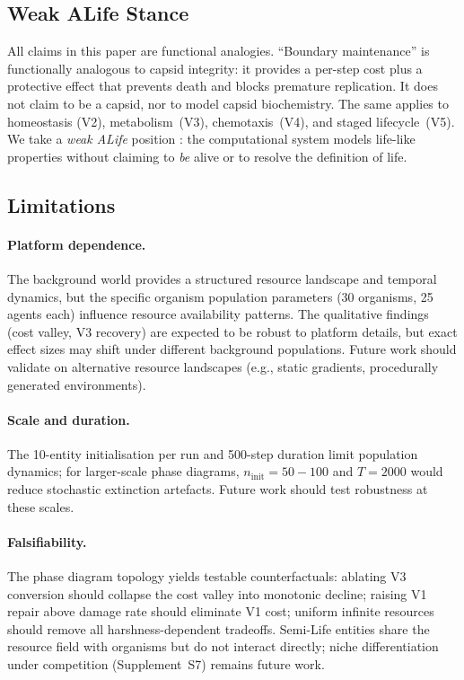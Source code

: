 \documentclass[letterpaper]{article}
\begin{document}
\subsection{Weak ALife Stance}

All claims in this paper are functional analogies.
``Boundary maintenance'' is functionally analogous to capsid integrity: it
provides a per-step cost plus a protective effect that prevents death and
blocks premature replication.
It does not claim to be a capsid, nor to model capsid biochemistry.
The same applies to homeostasis (V2), metabolism~(V3), chemotaxis~(V4),
and staged lifecycle~(V5).
We take a \emph{weak ALife} position \citep{langton_1989_artificial}:
the computational system models life-like properties without claiming to
\emph{be} alive or to resolve the definition of life.

\subsection{Limitations}

\paragraph{Platform dependence.}
The background world provides a structured resource landscape and temporal
dynamics, but the specific organism population parameters (30 organisms,
25 agents each) influence resource availability patterns.
The qualitative findings (cost valley, V3 recovery) are expected to be
robust to platform details, but exact effect sizes may shift under
different background populations.
Future work should validate on alternative resource landscapes
(e.g., static gradients, procedurally generated environments).

\paragraph{Scale and duration.}
The 10-entity initialisation per run and 500-step duration limit
population dynamics; for larger-scale phase diagrams,
$n_\text{init}\!=\!50{-}100$ and $T\!=\!2000$ would reduce stochastic
extinction artefacts.
Future work should test robustness at these scales.

\paragraph{Falsifiability.}
The phase diagram topology yields testable counterfactuals: ablating V3
conversion should collapse the cost valley into monotonic decline; raising
V1 repair above damage rate should eliminate V1 cost; uniform infinite
resources should remove all harshness-dependent tradeoffs.
Semi-Life entities share the resource field with organisms but do not
interact directly; niche differentiation under competition (Supplement~S7)
remains future work.
\end{document}
